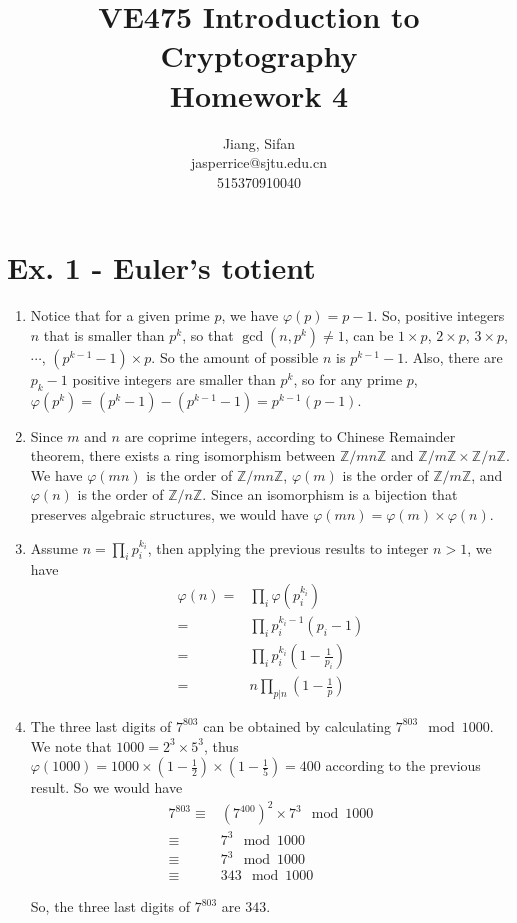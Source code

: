 \documentclass[11pt,a4paper]{article}
\title{
	VE475 Introduction to Cryptography \\
	Homework 4
}
\author{
	Jiang, Sifan\\
	jasperrice@sjtu.edu.cn\\
	515370910040
}
\begin{document}
\maketitle

\section*{Ex. 1 - Euler's totient}
\begin{enumerate}
\item Notice that for a given prime $p$, we have $\varphi(p) = p-1$. So, positive integers $n$ that is smaller than $p^{k}$, so that $\gcd(n, p^{k}) \neq 1$, can be $1 \times p$, $2 \times p$, $3 \times p$, $\cdots$, $(p^{k-1}-1) \times p$. So the amount of possible $n$ is $p^{k-1}-1$. Also, there are $p_{k}-1$ positive integers are smaller than $p^{k}$, so for any prime $p$, $\varphi(p^{k}) = (p^{k}-1)-(p^{k-1}-1) = p^{k-1}(p-1)$.

\item Since $m$ and $n$ are coprime integers, according to Chinese Remainder theorem, there exists a ring isomorphism between $\mathbb{Z}/mn\mathbb{Z}$ and $\mathbb{Z}/m\mathbb{Z} \times \mathbb{Z}/n\mathbb{Z}$. We have $\varphi(mn)$ is the order of $\mathbb{Z}/mn\mathbb{Z}$, $\varphi(m)$ is the order of $\mathbb{Z}/m\mathbb{Z}$, and $\varphi(n)$ is the order of $\mathbb{Z}/n\mathbb{Z}$. Since an isomorphism is a bijection that preserves algebraic structures, we would have $\varphi(mn) = \varphi(m) \times \varphi(n)$.

\item Assume $n = \prod_{i} p_{i}^{k_{i}}$, then applying the previous results to integer $n > 1$, we have
\begin{align*}
	\varphi(n) =& \prod_{i} \varphi(p_{i}^{k_{i}}) \\
	=& \prod_{i} p_{i}^{k_{i}-1}(p_{i}-1) \\
	=& \prod_{i} p_{i}^{k_{i}}(1-\frac{1}{p_{i}}) \\
	=& n \prod_{p\vert n}(1-\frac{1}{p})
\end{align*}

\item The three last digits of $7^{803}$ can be obtained by calculating $7^{803} \mod 1000$. We note that $1000 = 2^{3} \times 5^{3}$, thus $\varphi(1000) = 1000 \times (1-\frac{1}{2}) \times (1-\frac{1}{5}) = 400$ according to the previous result. So we would have
\begin{align*}
	7^{803} \equiv& (7^{400})^{2}\times 7^{3} \mod 1000 \\
	\equiv& 7^{3} \mod 1000 \\
	\equiv& 7^{3} \mod 1000 \\
	\equiv& 343	\mod 1000
\end{align*}
\par So, the three last digits of $7^{803}$ are $343$.
\end{enumerate}
\end{document}
